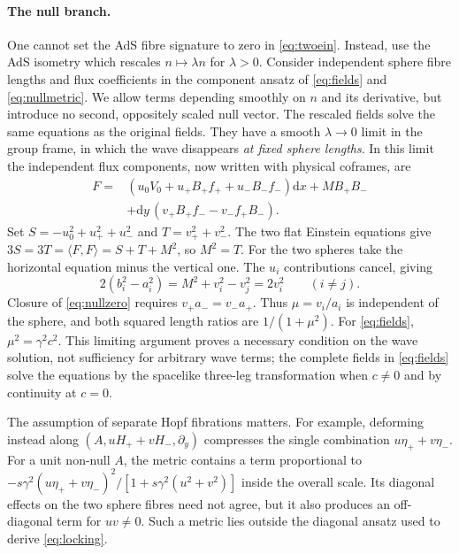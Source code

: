 \documentclass[11pt,a4paper]{article}
\numberwithin{equation}{section}
\newcommand{\dd}{\mathrm{d}}
\begin{document}
\paragraph{The null branch.}
One cannot set the AdS fibre signature to zero in \eqref{eq:twoein}. Instead, use the AdS isometry which rescales $n\mapsto\lambda n$ for $\lambda>0$. Consider independent sphere fibre lengths and flux coefficients in the component ansatz of \eqref{eq:fields} and \eqref{eq:nullmetric}. We allow terms depending smoothly on $n$ and its derivative, but introduce no second, oppositely scaled null vector. The rescaled fields solve the same equations as the original fields. They have a smooth $\lambda\to0$ limit in the group frame, in which the wave disappears \emph{at fixed sphere lengths}. In this limit the independent flux components, now written with physical coframes, are
\begin{align}
 F={}&(u_0 V_0+u_+ B_+ f_+ +u_- B_- f_-)\dd x+M B_+B_-\nonumber\\
 &+\dd y\,(v_+ B_+ f_- -v_- f_+B_-).\label{eq:nullzero}
\end{align}
Set $S=-u_0^2+u_+^2+u_-^2$ and $T=v_+^2+v_-^2$. The two flat Einstein equations give $3S=3T=\langle F,F\rangle=S+T+M^2$, so $M^2=T$. For the two spheres take the horizontal equation minus the vertical one. The $u_i$ contributions cancel, giving
\begin{equation*}
 2(b_i^2-a_i^2)=M^2+v_i^2-v_j^2=2v_i^2\qquad(i\ne j).
\end{equation*}
Closure of \eqref{eq:nullzero} requires $v_+a_-=v_-a_+$. Thus $\mu=v_i/a_i$ is independent of the sphere, and both squared length ratios are $1/(1+\mu^2)$. For \eqref{eq:fields}, $\mu^2=\gamma^2c^2$. This limiting argument proves a necessary condition on the wave solution, not sufficiency for arbitrary wave terms; the complete fields in \eqref{eq:fields} solve the equations by the spacelike three-leg transformation when $c\ne0$ and by continuity at $c=0$.

The assumption of separate Hopf fibrations matters. For example, deforming instead along $(A,uH_++vH_-,\partial_y)$ compresses the single combination $u\eta_++v\eta_-$. For a unit non-null $A$, the metric contains a term proportional to $-s\gamma^2(u\eta_++v\eta_-)^2/[1+s\gamma^2(u^2+v^2)]$ inside the overall scale. Its diagonal effects on the two sphere fibres need not agree, but it also produces an off-diagonal term for $uv\ne0$. Such a metric lies outside the diagonal ansatz used to derive \eqref{eq:locking}.
\end{document}
